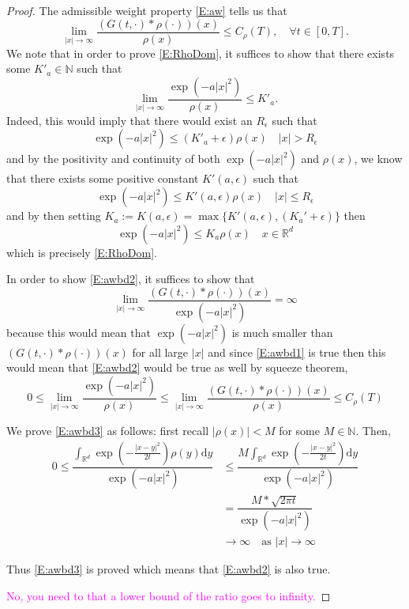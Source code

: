 \documentclass[a4paper,11pt]{article}%
\numberwithin{equation}{section}
\theoremstyle{plain}
\theoremstyle{definition}
\newcommand{\R}{\mathbb{R}}
\newcommand{\ud}{\ensuremath{ \mathrm{d} }}
\begin{document}
\begin{proof}
The admissible weight property \eqref{E:aw} tells us that
	\begin{equation} \label{E:awbd1}
		\lim_{|x| \to \infty}\frac{\left(G(t,\cdot)*\rho(\cdot)\right)(x)}{\rho(x)} \le 		C_{\rho}(T) ,\quad \forall t \in [0,T].
	\end{equation}
We note that in order to prove \eqref{E:RhoDom}, it suffices to show that there exists some $K'_a \in \mathbb{N}$ such that
	\begin{equation} \label{E:awbd2}
	\lim_{|x| \to \infty}\frac{\exp\left(-a|x|^2\right)}{\rho(x)} \le K'_a.
	\end{equation}
	Indeed, this would imply that there would exist an $R_\epsilon$ such that
	\[
	\exp\left(-a|x|^2\right) \le (K'_a+\epsilon)\rho(x) \quad |x|>R_\epsilon
	\]
	and by the positivity and continuity of both $	\exp\left(-a|x|^2\right)$ and $\rho(x)$, we know that there exists some positive constant $K'(a,\epsilon)$ such that
	\[
	\exp\left(-a|x|^2\right) \le K'(a,\epsilon)\rho(x) \quad |x|\le R_\epsilon
	\]
	and by then setting $K_a := K(a,\epsilon) = \max\{K'(a,\epsilon),(K_a'+\epsilon)\}$ then
	\[
	\exp\left(-a|x|^2\right) \le K_a\rho(x) \quad x \in \R^d
	\]
	which is precisely \eqref{E:RhoDom}.

	In order to show \eqref{E:awbd2}, it suffices to show that
	\begin{equation} \label{E:awbd3}
	\lim_{|x| \to \infty} \frac{\left(G(t,\cdot)*\rho(\cdot)\right)(x)}{\exp\left(-a|x|^2\right)} = \infty
	\end{equation}
	because this would mean that $\exp\left(-a|x|^2\right)$ is much smaller than $\left(G(t,\cdot)*\rho(\cdot)\right)(x)$ for all large $|x|$ and since \eqref{E:awbd1} is true then this would mean that \eqref{E:awbd2} would be true as well by squeeze theorem,
	\[
	0 \le \lim_{|x| \to \infty}\frac{\exp\left(-a|x|^2\right)}{\rho(x)} \le  \lim_{|x| \to \infty} \frac{\left(G(t,\cdot)*\rho(\cdot)\right)(x)}{\rho(x)} \le C_{\rho}(T)
	\]

	We prove \eqref{E:awbd3} as follows: first recall $|\rho(x)| < M$ for some $M \in \mathbb N$. Then,
	\begin{align*}
	0 \le	\dfrac{\int_{\mathbb R^d}\exp\left(-\frac{|x-y|^2}{2t}\right)\rho(y)\ud y}{\exp\left(-a|x|^2\right)} &\le \dfrac{M\int_{\mathbb R^d}\exp\left(-\frac{|x-y|^2}{2t}\right) \ud y}{\exp\left(-a|x|^2\right)}
	\\&  = \dfrac{M*\sqrt{2 \pi t}}{\exp\left(-a|x|^2\right)}
	\\& \to \infty \quad \text{as } |x|\to \infty
	\end{align*}

	Thus \eqref{E:awbd3} is proved which means that \eqref{E:awbd2} is also true.

	\textcolor{magenta}{No, you need to that a lower bound of the ratio goes to infinity.}

\end{proof}
\end{document}
